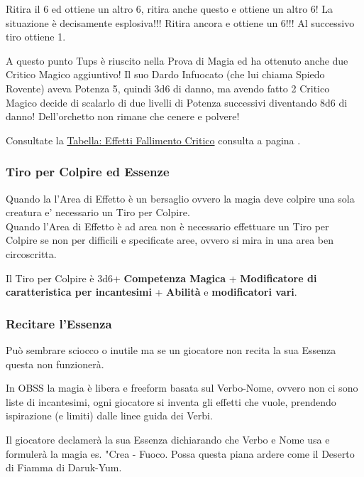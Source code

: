 \documentclass[a4paper,twoside,openany]{book}
\begin{document}
\begin{multicols}{2}
Ritira il 6 ed ottiene un altro 6, ritira anche questo e ottiene un altro 6! La situazione è decisamente esplosiva!!! Ritira ancora e ottiene un 6!!! Al successivo tiro ottiene 1.

A questo punto Tups è riuscito nella Prova di Magia ed ha ottenuto anche due Critico Magico aggiuntivo! Il suo Dardo Infuocato (che lui chiama Spiedo Rovente) aveva Potenza 5, quindi 3d6 di danno, ma avendo fatto 2 Critico Magico decide di scalarlo di due livelli di Potenza successivi diventando 8d6 di danno! Dell'orchetto non rimane che cenere e polvere!

Consultate la \hyperlink{magiefallimentocriticonellaprovadimagia}{Tabella: Effetti Fallimento Critico} consulta a pagina \pageref{magiefallimentocriticonellaprovadimagia}.


\subsubsection{Tiro per Colpire ed Essenze}

Quando la l'Area di Effetto è un bersaglio ovvero la magia deve colpire una sola creatura e' necessario un Tiro per Colpire.\\
Quando l'Area di Effetto è ad area non è necessario effettuare un Tiro per Colpire se non per difficili e specificate aree, ovvero si mira in una area ben circoscritta.

Il Tiro per Colpire è 3d6+ \textbf{Competenza Magica} + \textbf{Modificatore di caratteristica per incantesimi} + \textbf{Abilità} e \textbf{modificatori vari}.

\subsubsection{Recitare l'Essenza}

\label{recitare-lessenza}

Può sembrare sciocco o inutile ma se un giocatore non recita la sua Essenza questa non funzionerà.

In OBSS la magia è libera e freeform basata sul Verbo-Nome, ovvero non ci sono liste di incantesimi, ogni giocatore si inventa gli effetti che vuole, prendendo ispirazione (e limiti) dalle linee guida dei Verbi.

Il giocatore declamerà la sua Essenza dichiarando che Verbo e Nome usa e formulerà la magia es. "Crea - Fuoco. Possa questa piana ardere come il Deserto di Fiamma di Daruk-Yum.


\end{multicols}
\end{document}
